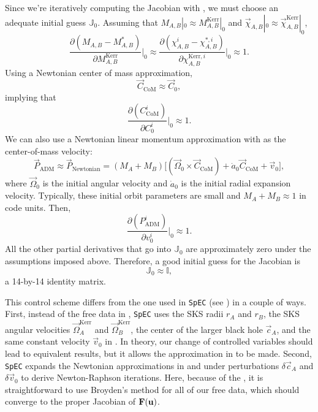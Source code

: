 \documentclass{../document}
\begin{document}
      Since we're iteratively computing the Jacobian with \eq{\eqref{eq:J-iteration}}, we must choose an adequate initial guess $\mathbb{J}_0$. Assuming that $M_{A,B}|_0 \approx M^\text{Kerr}_{A,B}|_0$ and $\vec\chi_{A,B}|_0 \approx \vec\chi^\text{Kerr}_{A,B}|_0$,
      \begin{equation}
        \frac{\partial (M_{A,B} - M^*_{A,B})}{\partial M^\text{Kerr}_{A,B}}\Bigg|_0
        \approx \frac{\partial (\chi^i_{A,B} - \chi^{*,i}_{A,B})}{\partial \chi^{\text{Kerr},i}_{A,B}}\Bigg|_0
        \approx 1.
      \end{equation}
      Using a Newtonian center of mass approximation,
      \begin{equation}
        \vec C_\text{CoM} \approx \vec C_0,
      \end{equation}
      implying that
      \begin{equation}
        \frac{\partial (C_\text{CoM}^i)}{\partial C_0^i}\Bigg|_0 \approx 1.
      \end{equation}
      We can also use a Newtonian linear momentum approximation with \eq{\eqref{eq:shift-boundary-condition}} as the center-of-mass velocity:
      \begin{equation} \label{eq:P-Newtonian}
        \vec P_\text{ADM} \approx \vec P_\text{Newtonian} = (M_A + M_B) \Big[ (\vec \Omega_0 \times \vec C_\text{CoM}) + \dot a_0 \vec C_\text{CoM} + \vec v_0 \Big],
      \end{equation}
      where $\vec \Omega_0$ is the initial angular velocity and $\dot a_0$ is the initial radial expansion velocity. Typically, these initial orbit parameters are small and $M_A + M_B \approx 1$ in code units. Then,
      \begin{equation}
        \frac{\partial (P_\text{ADM}^i)}{\partial v_0^i}\Bigg|_0 \approx 1.
      \end{equation}
      All the other partial derivatives that go into $\mathbb{J}_0$ are approximately zero under the assumptions imposed above. Therefore, a good initial guess for the Jacobian is
      \begin{equation} \label{eq:J0}
        \mathbb{J}_0 \approx \mathbb{I},
      \end{equation}
      a 14-by-14 identity matrix.

      This control scheme differs from the one used in {\tt SpEC} (see \cite{Serguei}) in a couple of ways. First, instead of the free data in \eq{\eqref{eq:u}}, {\tt SpEC} uses the SKS radii $r_{A}$ and $r_{B}$, the SKS angular velocities $\vec\Omega_{A}^\text{Kerr}$ and $\vec\Omega_{B}^\text{Kerr}$, the center of the larger black hole $\vec c_A$, and the same constant velocity $\vec v_0$ in \eq{\eqref{eq:shift-boundary-condition}}. In theory, our change of controlled variables should lead to equivalent results, but it allows the approximation in \eq{\eqref{eq:J0}} to be made. Second, {\tt SpEC} expands the Newtonian approximations in \eq{\eqref{eq:CoM-Newtonian}} and \eq{\eqref{eq:P-Newtonian}} under perturbations $\delta \vec c_A$ and $\delta \vec v_0$ to derive Newton-Raphson iterations. Here, because of the \eq{\eqref{eq:J0}}, it is straightforward to use Broyden's method for all of our free data, which should converge to the proper Jacobian of ${\bf F}(\bf u)$.
    
\end{document}

